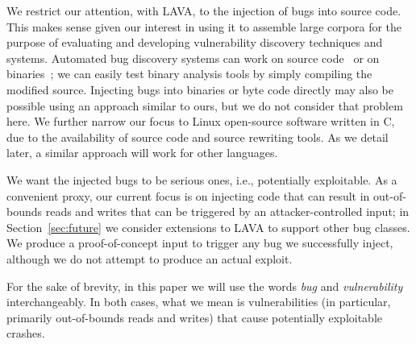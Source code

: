 
We restrict our attention, with LAVA, to the injection of bugs into source code.
This makes sense given our interest in using it to assemble large corpora for the purpose of evaluating and developing vulnerability discovery techniques and systems.
Automated bug discovery systems can work on source
code~\cite{Cadar:2008, Ganesh:2009, Haller:2013, Yamaguchi:2014} or on
binaries~\cite{Cha:2012, Wang:2010};
we can easily test binary analysis tools by simply compiling the modified source.
Injecting bugs into binaries or byte code directly may also be possible using an approach similar to ours, but we do not consider that problem here.
We further narrow our focus to Linux open-source software written in C, due to the availability of source code and source rewriting tools.
As we detail later, a similar approach will work for other languages.

We want the injected bugs to be serious ones, i.e., potentially exploitable.
As a convenient proxy, our current focus is on injecting code that can result in out-of-bounds reads and writes that can be triggered by an attacker-controlled input; in Section~\ref{sec:future} we consider extensions to LAVA to support other bug classes.
We produce a proof-of-concept input to trigger any bug we successfully inject, although we do not attempt to produce an actual exploit.

For the sake of brevity, in this paper we will use the words \emph{bug} and \emph{vulnerability} interchangeably.
In both cases, what we mean is vulnerabilities (in particular, primarily out-of-bounds reads and writes) that cause potentially exploitable crashes.
